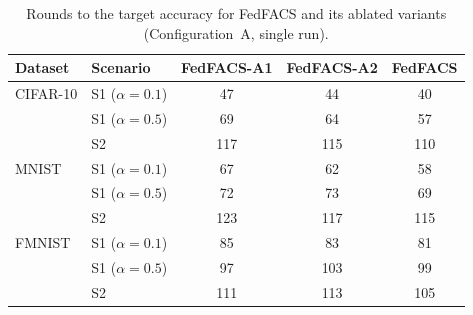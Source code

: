 \documentclass[pdflatex,sn-basic]{sn-jnl}
\begin{document}
\begin{table}[t]
\caption{Rounds to the target accuracy for FedFACS and its ablated variants (Configuration~A, single run).}\label{tab:abl-rounds}
\centering
\begin{tabular}{llccc}
\toprule
Dataset & Scenario & FedFACS-A1 & FedFACS-A2 & FedFACS\\
\midrule
CIFAR-10 & S1 ($\alpha=0.1$) & 47 & 44 & 40\\
 & S1 ($\alpha=0.5$) & 69 & 64 & 57\\
 & S2 & 117 & 115 & 110\\
MNIST & S1 ($\alpha=0.1$) & 67 & 62 & 58\\
 & S1 ($\alpha=0.5$) & 72 & 73 & 69\\
 & S2 & 123 & 117 & 115\\
FMNIST & S1 ($\alpha=0.1$) & 85 & 83 & 81\\
 & S1 ($\alpha=0.5$) & 97 & 103 & 99\\
 & S2 & 111 & 113 & 105\\
\bottomrule
\end{tabular}
\end{table}
\end{document}
